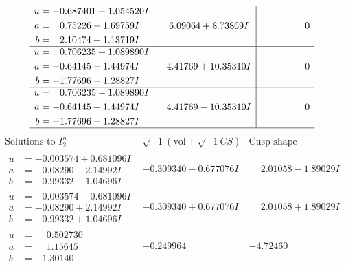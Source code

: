 \documentclass[1p]{elsarticle_modified}
\theoremstyle{definition}
\newcommand{\I}{\sqrt{-1}}
\begin{document}
$$\begin{array}{c|c|c}
\begin{aligned}
u &= -0.687401 - 1.054520 I \\
a &= \phantom{-}0.75226 + 1.69759 I \\
b &= \phantom{-}2.10474 + 1.13719 I\end{aligned}
 & \phantom{-}6.09064 + 8.73869 I & \phantom{-0.000000 } 0 \\ \hline\begin{aligned}
u &= \phantom{-}0.706235 + 1.089890 I \\
a &= -0.64145 - 1.44974 I \\
b &= -1.77696 - 1.28827 I\end{aligned}
 & \phantom{-}4.41769 + 10.35310 I & \phantom{-0.000000 } 0 \\ \hline\begin{aligned}
u &= \phantom{-}0.706235 - 1.089890 I \\
a &= -0.64145 + 1.44974 I \\
b &= -1.77696 + 1.28827 I\end{aligned}
 & \phantom{-}4.41769 - 10.35310 I & \phantom{-0.000000 } 0\\
 \hline 
 \end{array}$$\newpage$$\begin{array}{c|c|c}  
\text{Solutions to }I^u_{2}& \I (\text{vol} + \sqrt{-1}CS) & \text{Cusp shape}\\
 \hline 
\begin{aligned}
u &= -0.003574 + 0.681096 I \\
a &= -0.08290 - 2.14992 I \\
b &= -0.99332 - 1.04696 I\end{aligned}
 & -0.309340 - 0.677076 I & \phantom{-}2.01058 - 1.89029 I \\ \hline\begin{aligned}
u &= -0.003574 - 0.681096 I \\
a &= -0.08290 + 2.14992 I \\
b &= -0.99332 + 1.04696 I\end{aligned}
 & -0.309340 + 0.677076 I & \phantom{-}2.01058 + 1.89029 I \\ \hline\begin{aligned}
u &= \phantom{-}0.502730\phantom{ +0.000000I} \\
a &= \phantom{-}1.15645\phantom{ +0.000000I} \\
b &= -1.30140\phantom{ +0.000000I}\end{aligned}
 & -0.249964\phantom{ +0.000000I} & -4.72460\phantom{ +0.000000I} \\ \hline\begin{aligned}

\end{aligned}
\end{array}$$
\end{document}
